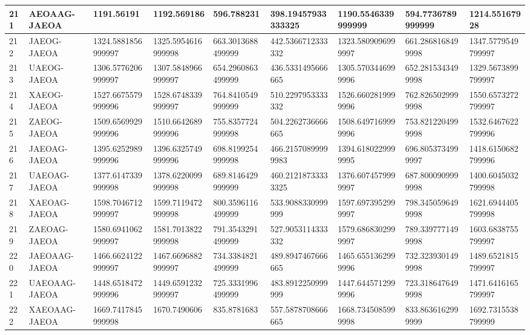 {\begin{longtable}{|l|l|l|l|l|l|l|l|l|}
        211 & AEOAAG-JAEOA & 1191.56191 & 1192.569186 & 596.788231 & 398.19457933333325 & 1190.5546339999999 & 594.7736789999999 & 1214.55167928 \\ \hline
        212 & JAEOG-JAEOA & 1324.5881856999997 & 1325.5954616999998 & 663.3013688499999 & 442.5366712333332 & 1323.5809096999997 & 661.2868168499998 & 1347.5779549799997 \\ \hline
        213 & UAEOG-JAEOA & 1306.5776206999997 & 1307.5848966999997 & 654.2960863499999 & 436.5331495666665 & 1305.5703446999996 & 652.2815343499998 & 1329.5673899799997 \\ \hline
        214 & XAEOG-JAEOA & 1527.6675579999996 & 1528.6748339999997 & 764.8410549999999 & 510.2297953333332 & 1526.6602819999996 & 762.8265029999998 & 1550.6573272799997 \\ \hline
        215 & ZAEOG-JAEOA & 1509.6569929999996 & 1510.6642689999996 & 755.8357724999998 & 504.2262736666665 & 1508.6497169999996 & 753.8212204999998 & 1532.6467622799996 \\ \hline
        216 & JAEOAG-JAEOA & 1395.6252989999996 & 1396.6325749999996 & 698.8199254999998 & 466.21570899999983 & 1394.6180229999995 & 696.8053734999997 & 1418.6150682799996 \\ \hline
        217 & UAEOAG-JAEOA & 1377.6147339999998 & 1378.6220099999998 & 689.8146429999999 & 460.21218733333325 & 1376.6074579999997 & 687.8000909999998 & 1400.6045032799998 \\ \hline
        218 & XAEOAG-JAEOA & 1598.7046712999997 & 1599.7119472999998 & 800.3596116499999 & 533.9088330999999 & 1597.6973952999997 & 798.3450596499998 & 1621.6944405799998 \\ \hline
        219 & ZAEOAG-JAEOA & 1580.6941062999997 & 1581.7013822999998 & 791.3543291499999 & 527.9053114333332 & 1579.6868302999997 & 789.3397771499998 & 1603.6838755799997 \\ \hline
        220 & JAEOAAG-JAEOA & 1466.6624122999997 & 1467.6696882999997 & 734.3384821499999 & 489.8947467666665 & 1465.6551362999996 & 732.3239301499998 & 1489.6521815799997 \\ \hline
        221 & UAEOAAG-JAEOA & 1448.6518472999996 & 1449.6591232999997 & 725.3331996499999 & 483.8912250999999 & 1447.6445712999996 & 723.3186476499998 & 1471.6416165799997 \\ \hline
        222 & XAEOAAG-JAEOA & 1669.7417845999998 & 1670.7490606 & 835.8781683 & 557.5878708666665 & 1668.7345085999998 & 833.8636162999999 & 1692.7315538799999 \\ \hline

\end{longtable}}
